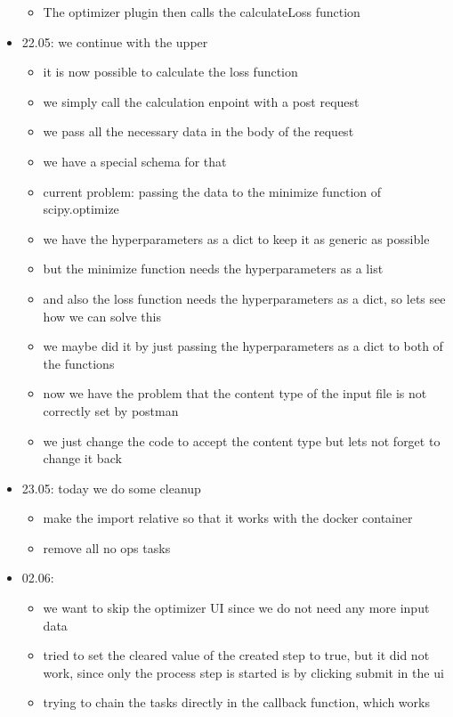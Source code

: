 \documentclass[
  a4paper,  %
  twoside,  %
  bibliography=totoc,
  headsepline,
  cleardoublepage=empty,
  parskip=half,
  draft=false
]{scrbook}
\begin{document}
\begin{itemize}
\begin{itemize}
    \item The optimizer plugin then calls the calculateLoss function
  \end{itemize}
  \item 22.05: we continue with the upper
  \begin{itemize}
    \item it is now possible to calculate the loss function
    \item we simply call the calculation enpoint with a post request
    \item we pass all the necessary data in the body of the request
    \item we have a special schema for that
    \item current problem: passing the data to the minimize function of scipy.optimize
    \item we have the hyperparameters as a dict to keep it as generic as possible
    \item but the minimize function needs the hyperparameters as a list
    \item and also the loss function needs the hyperparameters as a dict, so lets see how we can solve this
    \item we maybe did it by just passing the hyperparameters as a dict to both of the functions 
    \item now we have the problem that the content type of the input file is not correctly set by postman
    \item we just change the code to accept the content type but lets not forget to change it back
  \end{itemize}
  \item 23.05: today we do some cleanup
  \begin{itemize}
    \item make the import relative so that it works with the docker container
    \item remove all no ops tasks
  \end{itemize}
  \item 02.06: 
  \begin{itemize}
    \item we want to skip the optimizer UI since we do not need any more input data
    \item tried to set the cleared value of the created step to true, but it did not work, since only the process step is started is by clicking submit in the ui
    \item trying to chain the tasks directly in the callback function, which works

\end{itemize}
\end{itemize}
\end{document}
